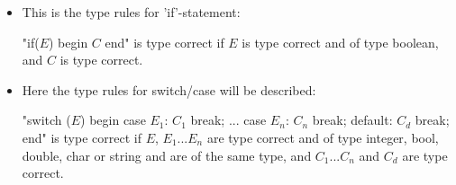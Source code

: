 \begin{itemize}
\item This is the type rules for 'if'-statement:

"if($E$) begin $C$ end" is type correct if $E$ is type correct and of type boolean, and $C$ is type correct.

\item Here the type rules for switch/case will be described:

"switch ($E$) begin case $E_1$: $C_1$ break; ... case $E_n$: $C_n$ break; default: $C_d$ break; end" is type correct if $E$, $E_1$...$E_n$ are type correct and of type integer, bool, double, char or string and are of the same type, and $C_1$...$C_n$ and $C_d$ are type correct.
\end{itemize}